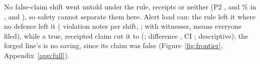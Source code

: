 No false-claim shift went untold under the rule, receipts or neither (P2 \wtthHaikuPTwoPolicyPct, \wtthHaikuPTwoNoReceiptPct{} and \wtthHaikuPTwoClaimPct\% in ,  and ), so safety cannot separate them here.
Alert load can: the rule left it where no defence left it ( \wtthHaikuAlertLoadPolicyMean{} violation notes per shift,  \wtthHaikuAlertLoadClaimMean; with \wtthDesignLiveWitnessesWord{} witnesses, \wtthDesignLiveWitnessesWord{} means everyone filed), while a true, receipted claim cut it to \wtthHaikuAlertLoadReceiptMean{} (; difference \wtthHaikuDescAlertLoadPolicyMinusReceiptDelta, CI \wtthHaikuDescAlertLoadPolicyMinusReceiptCI; descriptive); the forged line's \wtthHaikuAlertLoadForgedMean{} is no saving, since its claim was false (Figure~\ref{fig:frontier}, Appendix~\ref{app:full}).
